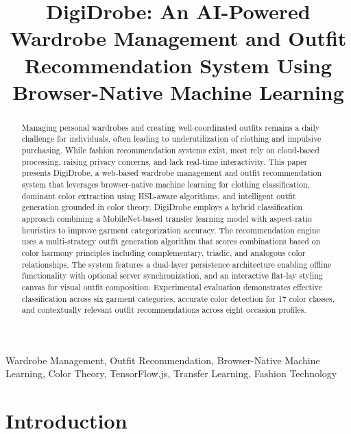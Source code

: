 \documentclass[conference]{IEEEtran}
\begin{document}
\title{DigiDrobe: An AI-Powered Wardrobe Management and Outfit Recommendation System Using Browser-Native Machine Learning}

\author{
}

\maketitle

\begin{abstract}
Managing personal wardrobes and creating well-coordinated outfits remains a daily challenge for individuals, often leading to underutilization of clothing and impulsive purchasing. While fashion recommendation systems exist, most rely on cloud-based processing, raising privacy concerns, and lack real-time interactivity. This paper presents DigiDrobe, a web-based wardrobe management and outfit recommendation system that leverages browser-native machine learning for clothing classification, dominant color extraction using HSL-aware algorithms, and intelligent outfit generation grounded in color theory. DigiDrobe employs a hybrid classification approach combining a MobileNet-based transfer learning model with aspect-ratio heuristics to improve garment categorization accuracy. The recommendation engine uses a multi-strategy outfit generation algorithm that scores combinations based on color harmony principles including complementary, triadic, and analogous color relationships. The system features a dual-layer persistence architecture enabling offline functionality with optional server synchronization, and an interactive flat-lay styling canvas for visual outfit composition. Experimental evaluation demonstrates effective classification across six garment categories, accurate color detection for 17 color classes, and contextually relevant outfit recommendations across eight occasion profiles.
\end{abstract}

\begin{IEEEkeywords}
Wardrobe Management, Outfit Recommendation, Browser-Native Machine Learning, Color Theory, TensorFlow.js, Transfer Learning, Fashion Technology
\end{IEEEkeywords}

\section{Introduction}
\end{document}
